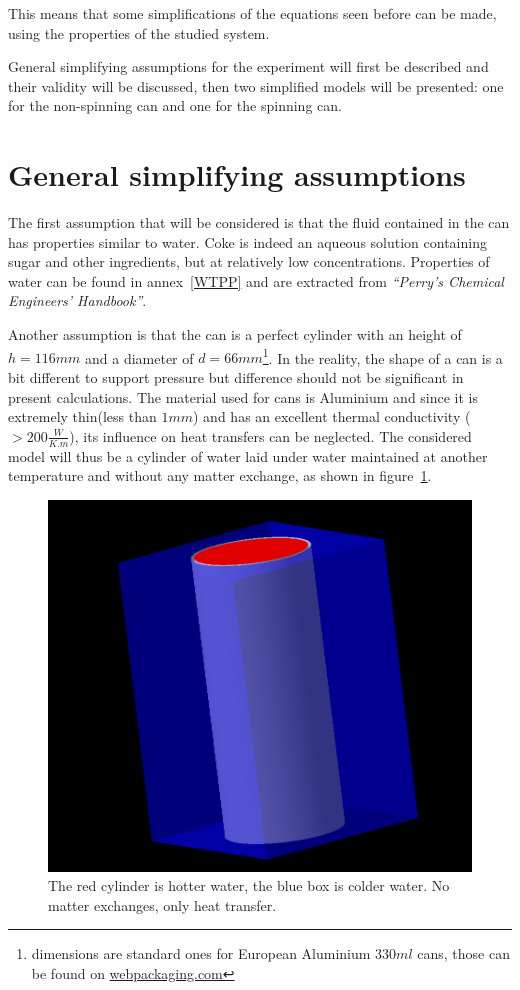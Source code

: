 \documentclass{report}
\begin{document}
	This means that some simplifications of the equations seen before can be made, using the properties of the studied system.
	
	General simplifying assumptions for the experiment will first be described and their validity will be discussed, then two simplified models will be presented: one for the non-spinning can and one for the spinning can.
	
	\section{General simplifying assumptions}\label{gsa}
	
	The first assumption that will be considered is that the fluid contained in the can has properties similar to water. Coke is indeed an aqueous solution containing sugar and other ingredients, but at relatively low concentrations.
	Properties of water can be found in annex~\ref{WTPP} and are extracted from \emph{``Perry’s Chemical Engineers’ Handbook''\cite{properties}}.
	
	Another assumption is that the can is a perfect cylinder with an height of $h=116mm$ and a diameter of $d=66mm$\footnote{dimensions are standard ones for European Aluminium $330ml$ cans, those can be found on \hyperref{http://www.webpackaging.com/en/portals/rexam/assets/11059498/spec-alu-202/}{}{}{webpackaging.com}}. In the reality, the shape of a can is a bit different to support pressure but difference should not be significant in present calculations. The material used for cans is Aluminium and since it is extremely thin(less than $1mm$) and has an excellent thermal conductivity ($>200\frac{W}{K.m}$), its influence on heat transfers can be neglected. The considered model will thus be a cylinder of water laid under water maintained at another temperature and without any matter exchange, as shown in figure~\ref{cyl}.
	
	\begin{figure}
		\centering
		\includegraphics[width=.5\textwidth]{img/cyl.jpg}
		\caption{The red cylinder is hotter water, the blue box is colder water. No matter exchanges, only heat transfer.}
		\label{cyl}
	\end{figure}
	
\end{document}
